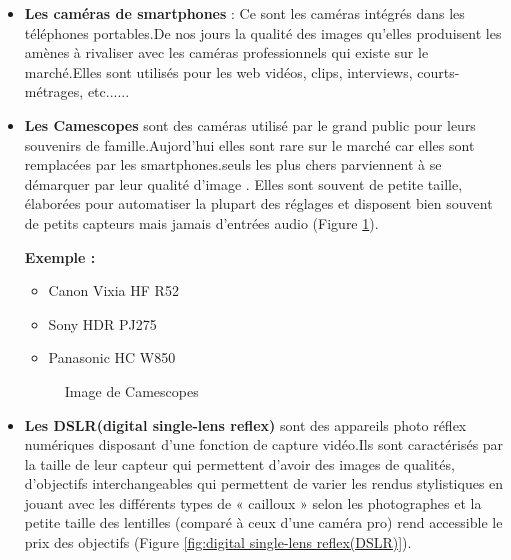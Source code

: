  \begin{itemize}
 	\item \textbf{Les caméras de smartphones} : Ce sont les caméras intégrés dans les téléphones portables.De nos jours la qualité des images qu'elles produisent les amènes à rivaliser avec les caméras professionnels qui existe sur le marché.Elles sont utilisés pour les web vidéos, clips, interviews, courts-métrages, etc......
 	
 	\item \textbf{Les Camescopes} sont des caméras utilisé par le grand public pour leurs souvenirs de famille.Aujord'hui elles sont rare sur le marché car elles sont remplacées par les smartphones.seuls les plus chers parviennent à se démarquer par leur qualité d’image . Elles sont souvent de petite taille, élaborées pour automatiser la plupart des réglages et disposent bien souvent de petits capteurs mais jamais d’entrées audio (Figure \ref{fig:Cmescopes}).
 	
 	\textbf{Exemple :}
 	
 	\begin{itemize}
 		\item Canon Vixia HF R52
 		\item Sony HDR PJ275
 		\item Panasonic HC W850
 	\end{itemize}
 	
 	\begin{figure}[H]%
 		\center%
 		\setlength{\fboxsep}{5pt}%
 		\setlength{\fboxrule}{0.5pt}%
 		\caption[Camescopes]{Image de Camescopes}%
 		\label{fig:Cmescopes}
 	\end{figure}
 	
 	\item \textbf{Les DSLR(digital single-lens reflex)} sont des appareils photo réflex numériques disposant d’une fonction de capture vidéo.Ils sont caractérisés par la taille de leur capteur qui permettent d'avoir des images de qualités, d’objectifs interchangeables qui permettent de varier les rendus stylistiques en jouant avec les différents types de « cailloux » selon les photographes et la petite taille des lentilles (comparé à ceux d’une caméra pro) rend accessible le prix des objectifs (Figure \ref{fig:digital single-lens reflex(DSLR)}).
 	

\end{itemize}
